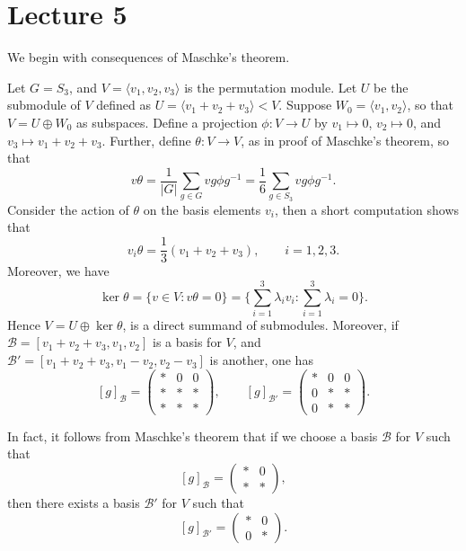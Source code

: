 \documentclass[11pt, notitlepage]{article}
\numberwithin{equation}{section}
\theoremstyle{plain}
\theoremstyle{definition}
\newenvironment{example}
	{\pushQED{\qed}\renewcommand{\qedsymbol}{$\blacktriangleleft$}\examplex}
	{\popQED\endexamplex}
\begin{document}



\section{Lecture 5}



We begin with consequences of Maschke's theorem.

\begin{example}
Let $G = S_3$, and $V = \langle v_1,v_2,v_3 \rangle$ is the permutation module. Let $U$ be the submodule of $V$ defined as $U = \langle v_1 + v_2 + v_3 \rangle < V$. Suppose $W_0 = \langle v_1, v_2 \rangle$, so that $V = U \oplus W_0$ as subspaces. Define a projection $\phi : V \to U$ by $v_1 \mapsto 0$, $v_2 \mapsto 0$, and $v_3 \mapsto v_1 + v_2 + v_3$. Further, define $\theta : V \to V$, as in proof of Maschke's theorem, so that
\[
    v\theta = \frac{1}{|G|}\sum_{g \in G}vg\phi g^{-1} = \frac{1}{6}\sum_{g \in S_3}vg\phi g^{-1}.
\]
Consider the action of $\theta$ on the basis elements $v_i$, then a short computation shows that
\[
    v_i\theta = \frac{1}{3}(v_1 + v_2 + v_3), \qquad i=1,2,3.
\]
Moreover, we have
\[
    \ker \theta = \{v \in V : v\theta = 0\} = \bigg\{\sum_{i=1}^3 \lambda_iv_i : \sum_{i=1}^3 \lambda_i = 0\bigg\}.
\]
Hence $V = U \oplus \ker \theta$, is a direct summand of submodules. Moreover, if $\mathcal B = [v_1+v_2+v_3,v_1,v_2]$ is a basis for $V$, and $\mathcal B' = [v_1 + v_2 + v_3, v_1 - v_2, v_2 - v_3]$ is another, one has
\[
    [g]_{\mathcal B} = \begin{pmatrix*}
        * & 0 & 0\\
        * & * & *\\
        * & * & *
    \end{pmatrix*}, \qquad [g]_{\mathcal B'} = \begin{pmatrix*}
        * & 0 & 0\\
        0 & * & *\\
        0 & * & *
    \end{pmatrix*}.
\]
\end{example}

In fact, it follows from Maschke's theorem that if we choose a basis $\mathcal B$ for $V$ such that
\[
    [g]_{\mathcal B} = \begin{pmatrix*}
        * & 0\\ * & *
    \end{pmatrix*},
\]
then there exists a basis $\mathcal B'$ for $V$ such that
\[
    [g]_{\mathcal B'} = \begin{pmatrix*}
        * & 0\\0 & *
    \end{pmatrix*}.
\]
\end{document}
